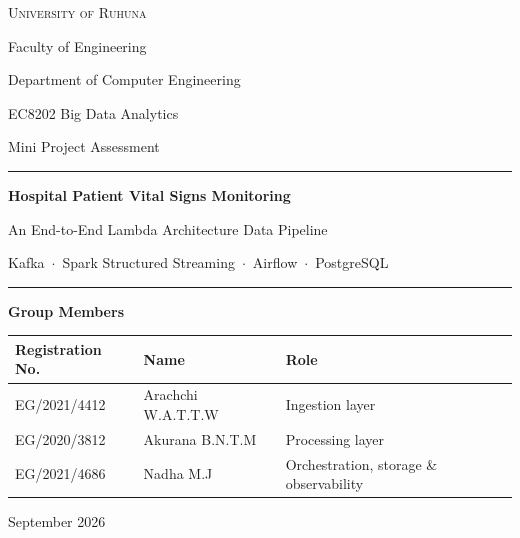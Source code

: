 \documentclass[11pt,a4paper]{article}
\begin{document}
\begin{titlepage}
  \centering
  \vspace*{0.6cm}
  {\large\scshape University of Ruhuna\par}
  \vspace{0.15cm}
  {\normalsize Faculty of Engineering\par}
  {\normalsize Department of Computer Engineering\par}
  \vspace{1.6cm}
  {\large EC8202 Big Data Analytics\par}
  \vspace{0.3cm}
  {\normalsize Mini Project Assessment \par}
  \vspace{1.5cm}
  \rule{\linewidth}{0.8pt}\par\vspace{0.4cm}
  {\LARGE\bfseries Hospital Patient Vital Signs Monitoring\par}
  \vspace{0.3cm}
  {\Large An End-to-End Lambda Architecture Data Pipeline\par}
  \vspace{0.3cm}
  {\normalsize Kafka \,$\cdot$\, Spark Structured Streaming \,$\cdot$\, Airflow \,$\cdot$\, PostgreSQL\par}
  \vspace{0.4cm}
  \rule{\linewidth}{0.8pt}\par
  \vspace{0.6cm}
  {\large \par}
  \vspace{2.0cm}
  {\large\bfseries Group Members\par}
  \vspace{0.4cm}
  \begin{tabular}{lll}
    \toprule
    \textbf{Registration No.} & \textbf{Name} & \textbf{Role} \\
    \midrule
    EG/2021/4412 & Arachchi W.A.T.T.W & Ingestion layer \\
    EG/2020/3812 & Akurana B.N.T.M & Processing layer \\
    EG/2021/4686 & Nadha M.J & Orchestration, storage \& observability \\
    \bottomrule
  \end{tabular}
  \vfill
  {\small \par}
  \vspace{0.3cm}
  {\large September 2026\par}
\end{titlepage}
\end{document}
